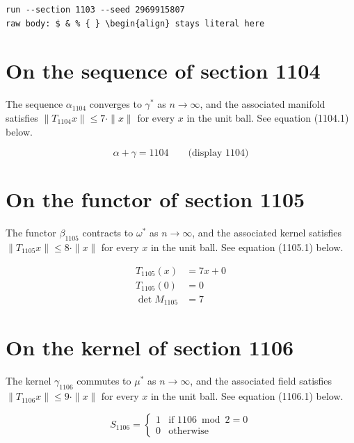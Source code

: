 \documentclass{article}
\begin{document}
\begin{verbatim}
run --section 1103 --seed 2969915807
raw body: $ & % { } \begin{align} stays literal here
\end{verbatim}

\section{On the sequence of section 1104}
The sequence $\alpha_{1104}$ converges to $\gamma^{*}$ as $n \to \infty$,
and the associated manifold satisfies $\|T_{1104} x\| \leq 7 \cdot \|x\|$
for every $x$ in the unit ball. See equation (1104.1) below.

$$
\alpha + \gamma = 1104 \qquad \text{(display 1104)}
$$

\section{On the functor of section 1105}
The functor $\beta_{1105}$ contracts to $\omega^{*}$ as $n \to \infty$,
and the associated kernel satisfies $\|T_{1105} x\| \leq 8 \cdot \|x\|$
for every $x$ in the unit ball. See equation (1105.1) below.

\begin{align}
T_{1105}(x) &= 7 x + 0 \\
T_{1105}(0) &= 0 \\
\det M_{1105} &= 7
\end{align}

\section{On the kernel of section 1106}
The kernel $\gamma_{1106}$ commutes to $\mu^{*}$ as $n \to \infty$,
and the associated field satisfies $\|T_{1106} x\| \leq 9 \cdot \|x\|$
for every $x$ in the unit ball. See equation (1106.1) below.

\begin{equation}
S_{1106} = \begin{cases} 1 & \text{if } 1106 \bmod 2 = 0 \\ 0 & \text{otherwise} \end{cases}
\end{equation}
\end{document}
